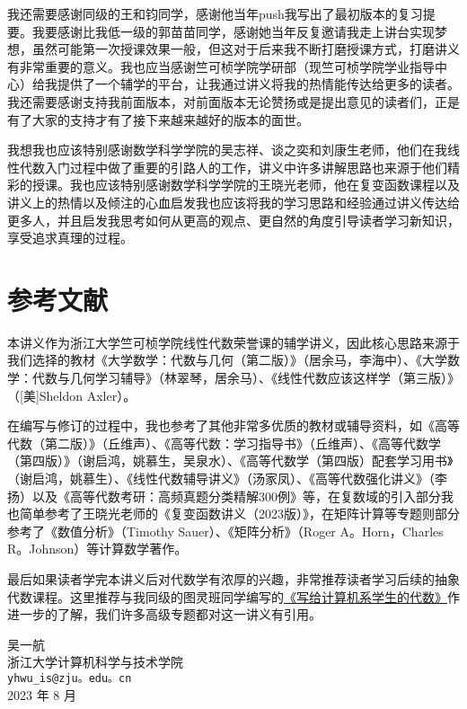 我还需要感谢同级的王和钧同学，感谢他当年push我写出了最初版本的复习提要。我要感谢比我低一级的郭苗苗同学，感谢她当年反复邀请我走上讲台实现梦想，虽然可能第一次授课效果一般，但这对于后来我不断打磨授课方式，打磨讲义有非常重要的意义。我也应当感谢竺可桢学院学研部（现竺可桢学院学业指导中心）给我提供了一个辅学的平台，让我通过讲义将我的热情能传达给更多的读者。我还需要感谢支持我前面版本，对前面版本无论赞扬或是提出意见的读者们，正是有了大家的支持才有了接下来越来越好的版本的面世。

我想我也应该特别感谢数学科学学院的吴志祥、谈之奕和刘康生老师，他们在我线性代数入门过程中做了重要的引路人的工作，讲义中许多讲解思路也来源于他们精彩的授课。我也应该特别感谢数学科学学院的王晓光老师，他在复变函数课程以及讲义上的热情以及倾注的心血启发我也应该将我的学习思路和经验通过讲义传达给更多人，并且启发我思考如何从更高的观点、更自然的角度引导读者学习新知识，享受追求真理的过程。

\section*{参考文献}

本讲义作为浙江大学竺可桢学院线性代数荣誉课的辅学讲义，因此核心思路来源于我们选择的教材《大学数学：代数与几何（第二版）》（居余马，李海中）、《大学数学：代数与几何学习辅导》（林翠琴，居余马）、《线性代数应该这样学（第三版）》（[美]Sheldon Axler）。

在编写与修订的过程中，我也参考了其他非常多优质的教材或辅导资料，如《高等代数（第二版）》（丘维声）、《高等代数：学习指导书》（丘维声）、《高等代数学（第四版）》（谢启鸿，姚慕生，吴泉水）、《高等代数学（第四版）配套学习用书》（谢启鸿，姚慕生）、《线性代数辅导讲义》（汤家凤）、《高等代数强化讲义》（李扬）以及《高等代数考研：高频真题分类精解300例》等，在复数域的引入部分我也简单参考了王晓光老师的《复变函数讲义（2023版）》，在矩阵计算等专题则部分参考了《数值分析》（Timothy Sauer）、《矩阵分析》（Roger A。Horn，Charles R。Johnson）等计算数学著作。

最后如果读者学完本讲义后对代数学有浓厚的兴趣，非常推荐读者学习后续的抽象代数课程。这里推荐与我同级的图灵班同学编写的\href{https://frightenedfoxcn。github。io/notes/series/alg-for-cs/}{《写给计算机系学生的代数》}作进一步的了解，我们许多高级专题都对这一讲义有引用。

\begin{flushright}
    \kaishu
    吴一航 \\
    浙江大学计算机科学与技术学院 \\
    \verb|yhwu_is@zju。edu。cn| \\
    2023 年 8 月
\end{flushright}
